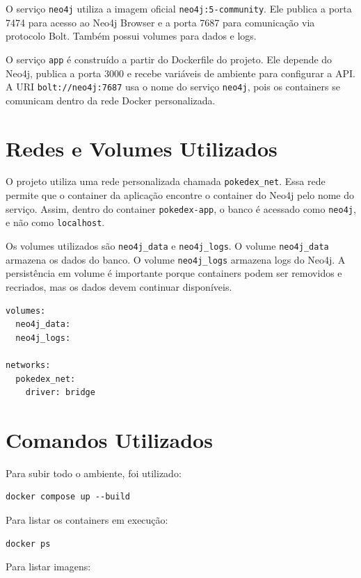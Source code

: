 \documentclass[12pt,a4paper]{article}
\begin{document}
O serviço \texttt{neo4j} utiliza a imagem oficial \texttt{neo4j:5-community}. Ele publica a porta 7474 para acesso ao Neo4j Browser e a porta 7687 para comunicação via protocolo Bolt. Também possui volumes para dados e logs.

O serviço \texttt{app} é construído a partir do Dockerfile do projeto. Ele depende do Neo4j, publica a porta 3000 e recebe variáveis de ambiente para configurar a API. A URI \texttt{bolt://neo4j:7687} usa o nome do serviço \texttt{neo4j}, pois os containers se comunicam dentro da rede Docker personalizada.

\section{Redes e Volumes Utilizados}

O projeto utiliza uma rede personalizada chamada \texttt{pokedex\_net}. Essa rede permite que o container da aplicação encontre o container do Neo4j pelo nome do serviço. Assim, dentro do container \texttt{pokedex-app}, o banco é acessado como \texttt{neo4j}, e não como \texttt{localhost}.

Os volumes utilizados são \texttt{neo4j\_data} e \texttt{neo4j\_logs}. O volume \texttt{neo4j\_data} armazena os dados do banco. O volume \texttt{neo4j\_logs} armazena logs do Neo4j. A persistência em volume é importante porque containers podem ser removidos e recriados, mas os dados devem continuar disponíveis.

\begin{lstlisting}
volumes:
  neo4j_data:
  neo4j_logs:

networks:
  pokedex_net:
    driver: bridge
\end{lstlisting}

\section{Comandos Utilizados}

Para subir todo o ambiente, foi utilizado:

\begin{lstlisting}
docker compose up --build
\end{lstlisting}

Para listar os containers em execução:

\begin{lstlisting}
docker ps
\end{lstlisting}

Para listar imagens:
\end{document}
